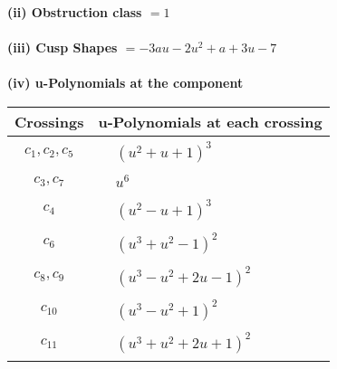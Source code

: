 \documentclass[1p]{elsarticle_modified}
\theoremstyle{definition}
\begin{document}
\flushleft \textbf{(ii) Obstruction class $= 1$}\\~\\
\flushleft \textbf{(iii) Cusp Shapes $= -3 a u-2 u^2+a+3 u-7$}\\~\\
\newpage\renewcommand{\arraystretch}{1}
\flushleft \textbf{(iv) u-Polynomials at the component}\newline \\
\begin{tabular}{m{50pt}|m{274pt}}
Crossings & \hspace{64pt}u-Polynomials at each crossing \\
\hline $$\begin{aligned}c_{1},c_{2},c_{5}\end{aligned}$$&$\begin{aligned}
&(u^2+u+1)^3
\end{aligned}$\\
\hline $$\begin{aligned}c_{3},c_{7}\end{aligned}$$&$\begin{aligned}
&u^6
\end{aligned}$\\
\hline $$\begin{aligned}c_{4}\end{aligned}$$&$\begin{aligned}
&(u^2- u+1)^3
\end{aligned}$\\
\hline $$\begin{aligned}c_{6}\end{aligned}$$&$\begin{aligned}
&(u^3+u^2-1)^2
\end{aligned}$\\
\hline $$\begin{aligned}c_{8},c_{9}\end{aligned}$$&$\begin{aligned}
&(u^3- u^2+2 u-1)^2
\end{aligned}$\\
\hline $$\begin{aligned}c_{10}\end{aligned}$$&$\begin{aligned}
&(u^3- u^2+1)^2
\end{aligned}$\\
\hline $$\begin{aligned}c_{11}\end{aligned}$$&$\begin{aligned}
&(u^3+u^2+2 u+1)^2
\end{aligned}$\\
\hline
\end{tabular}\\~\\
\end{document}
